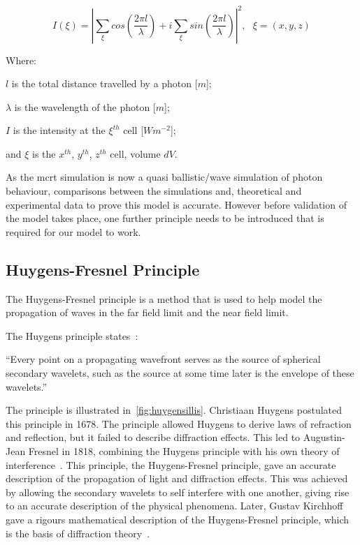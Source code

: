 \begin{equation}
I(\xi)=\left| \sum\limits_{\xi}cos\left(\frac{2\pi l}{\lambda}\right) + i \sum\limits_{\xi}sin\left(\frac{2\pi l}{\lambda}\right)\right|^2,\ \ \ \xi=(x,y,z)
\label{eqn:intense}
\end{equation}

\noindent Where:

\indent $l$ is the total distance travelled by a photon [$m$];

\indent $\lambda$ is the wavelength of the photon [$m$];

\indent $I$ is the intensity at the $\xi^{th}$ cell [$W m^{-2}$];

\indent and $\xi$ is the $x^{th}$, $y^{th}$, $z^{th}$ cell, volume $dV$.

\medskip

As the \gls*{mcrt} simulation is now a quasi ballistic/wave simulation of photon behaviour, comparisons between the simulations and, theoretical and experimental data to prove this model is accurate. However before validation of the model takes place, one further principle needs to be introduced that is required for our model to work.

\subsection{Huygens-Fresnel Principle}

The Huygens-Fresnel principle is a method that is used to help model the propagation of waves in the far field limit and the near field limit. 

The Huygens principle states~\cite{huygens2012treatise,hecht2017optics,huygens1900wave}: 

\medskip

``Every point on a propagating wavefront serves as the source of spherical secondary wavelets, such as the source at some time later is the envelope of these wavelets.''

\medskip

The principle is illustrated in~\cref{fig:huygensillis}. Christiaan Huygens postulated this principle in 1678.
The principle allowed Huygens to derive laws of refraction and reflection, but it failed to describe diffraction effects.
This led to Augustin-Jean Fresnel in 1818, combining the Huygens principle with his own theory of interference~\cite{fresnel1819memoire,huygens1900wave}.
This principle, the Huygens-Fresnel principle, gave an accurate description of the propagation of light and diffraction effects.
This was achieved by allowing the secondary wavelets to self interfere with one another, giving rise to an accurate description of the physical phenomena.
Later, Gustav Kirchhoff gave a rigours mathematical description of the Huygens-Fresnel principle, which is the basis of diffraction theory~\cite{kirchhoff1883ann,born2000principles}. 

